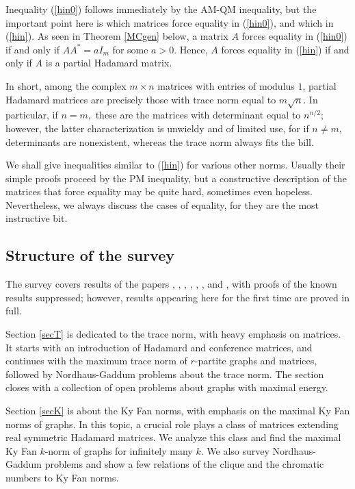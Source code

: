 \documentclass[12pt]{article}%
\begin{document}
Inequality (\ref{hin0}) follows immediately by the AM-QM inequality, but the
important point here is which matrices force equality in (\ref{hin0}), and
which in (\ref{hin}). As seen in Theorem \ref{MCgen} below, a matrix $A$
forces equality in (\ref{hin0}) if and only if $AA^{\ast}=aI_{m}$ for some
$a>0$. Hence, $A$ forces equality in (\ref{hin}) if and only if $A$ is a
partial Hadamard matrix.\medskip

In short, among the complex $m\times n$ matrices with entries of modulus $1$,
partial Hadamard matrices are precisely those with trace norm equal to
$m\sqrt{n}$. In particular, if $n=m,$ these are the matrices with determinant
equal to $n^{n/2}$; however, the latter characterization is unwieldy and of
limited use, for if $n\neq m,$ determinants are nonexistent, whereas the trace
norm always fits the bill.\medskip

We shall give inequalities similar to (\ref{hin}) for various other norms.
Usually their simple proofs proceed by the PM inequality, but a constructive
description of the matrices that force equality may be quite hard, sometimes
even hopeless. Nevertheless, we always discuss the cases of equality, for they
are the most instructive bit.

\subsection{Structure of the survey}

The survey covers results of the papers \cite{GHK01}, \cite{KhRe08},
\cite{Nik11c}, \cite{Nik12}, \cite{Nik15b}, \cite{Nik15c}, and \cite{NiYu13},
with proofs of the known results suppressed; however, results appearing here
for the first time are proved in full.

Section \ref{secT} is dedicated to the trace norm, with heavy emphasis on
matrices. It starts with an introduction of Hadamard and conference matrices,
and continues with the maximum trace norm of $r$-partite graphs and matrices,
followed by Nordhaus-Gaddum problems about the trace norm. The section closes
with a collection of open problems about graphs with maximal energy.

Section \ref{secK} is about the Ky Fan norms, with emphasis on the maximal Ky
Fan norms of graphs. In this topic, a crucial role plays a class of matrices
extending real symmetric Hadamard matrices. We analyze this class and find the
maximal Ky Fan $k$-norm of graphs for infinitely many $k.$ We also survey
Nordhaus-Gaddum problems and show a few relations of the clique and the
chromatic numbers to Ky Fan norms.
\end{document}
